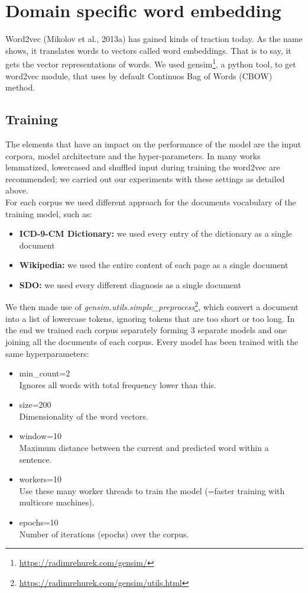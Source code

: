 \chapter{Domain specific word embedding}

Word2vec (Mikolov et al., 2013a) has gained kinds of traction today. As the name shows, it translates words to vectors called word embeddings. That is to say, it gets the vector representations of words. We used gensim\footnote{\url{https://radimrehurek.com/gensim/}}, a python tool, to get word2vec module, that uses by default Continuos Bag of Words (CBOW) method.

\section{Training}

The elements that have an impact on the performance of the model are the input corpora, model architecture and the hyper-parameters.
In many works lemmatized, lowercased and shuffled input during training the word2vec are recommended; we carried out our experiments with these settings as detailed above.\\
For each corpus we used different approach for the documents vocabulary of the training model, such as:
\begin{itemize}
	\item \textbf{ICD-9-CM Dictionary:} we used every entry of the dictionary as a single document
	\item \textbf{Wikipedia:} we used the entire content of each page as a single document
	\item \textbf{SDO:} we used every different diagnosis as a single document
\end{itemize}

We then made use of \textit{gensim.utils.simple\_preprocess}\footnote{\url{https://radimrehurek.com/gensim/utils.html}}, which convert a document into a list of lowercase tokens, ignoring tokens that are too short or too long.
In the end we trained each corpus separately forming 3 separate models and one joining all the documents of each corpus. Every model has been trained with the same hyperparameters:
\begin{itemize}
	\item min\_count=2 \\
	Ignores all words with total frequency lower than this.
	\item size=200 \\
	Dimensionality of the word vectors.
	\item window=10\\
	Maximum distance between the current and predicted word within a sentence.
	\item workers=10 \\
	Use these many worker threads to train the model (=faster training with multicore machines).
	\item epochs=10 \\
	Number of iterations (epochs) over the corpus.
\end{itemize}

